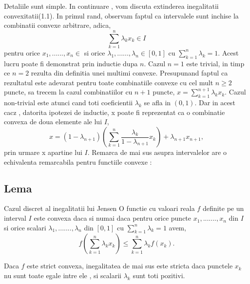 \documentclass[a4paper,12pt,oneside]{report}
\begin{document}
Detaliile sunt simple. 
In continuare , vom discuta extinderea inegalitatii convexitatii(1.1). In primul rand, observam faptul ca intervalele sunt inchise la combinatii convexe arbitrare, adica, 
\begin{displaymath}
  \sum_{ k= 1}^{n}\lambda _{k}x_{k} \in I
\end{displaymath}
pentru orice \(x_{1},......, x_{n} \in\)  si orice \(\lambda _{1},......, \lambda _{n} \in \left [ 0 , 1  \right ]\) cu \(\sum_{k = 1}^{n} \lambda _{k} = 1\). Acest lucru poate fi demonstrat prin inductie dupa \(n\). Cazul \(n=1\) este trivial, in timp ce \(n = 2\) rezulta din definitia unei multimi convexe. Presupunand faptul ca rezultatul este adevarat pentru toate combinatiile convexe cu cel mult \(n\geq 2\) puncte, sa trecem la cazul combinatiilor cu \(n + 1\) puncte, \(x = \sum_{k = 1}^{n + 1} \lambda _{k}x_{k}\). Cazul non-trivial este atunci cand toti coeficientii \(\lambda _{k}\) se afla in \(\left ( 0 , 1 \right )\). Dar in acest cacz , datorita ipotezei de inductie, x poate fi reprezentat ca o combinatie convexa de doua elemente ale lui \(I\), 
\begin{displaymath}
  x = \left ( 1 - \lambda _{n + 1} \right )\left ( \sum_{k = 1}^{n} \frac{\lambda _{k}}{1 - \lambda _{n + 1}} x_{k}\right ) + \lambda _{n + 1}x_{n + 1},
\end{displaymath}
prin urmare x apartine lui \(I\). 
	Remarca de mai sus asupra intervalelor are o echivalenta remarcabila pentru functiile convexe :

\subsection{Lema}
Cazul discret al inegalitatii lui Jensen
O functie cu valoari reala \(f\) definite pe un interval \(I\) este convexa daca si numai daca pentru orice puncte \(x_{1},.......,x_{n}\) din \(I\) si orice scalari \(\lambda _{1},.......,\lambda _{n}\) din \(\left [ 0 , 1 \right ]\) cu \(\sum_{k = 1}^{n}\lambda _{k}= 1\) avem, 
\begin{displaymath}
  f\left ( \sum_{k = 1}^{n} \lambda _{k}x_{k}\right )\leq \sum_{k = 1}^{n}\lambda _{k}f\left ( x_{k} \right ).
\end{displaymath}

Daca \(f\) este strict convexa, inegalitatea de mai sus este stricta daca punctele \(x_{k}\) nu sunt toate egale intre ele , si scalarii \(\lambda _{k}\) sunt toti pozitivi. 
\end{document}
